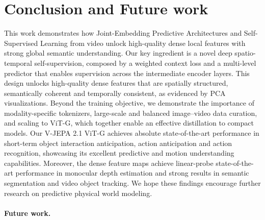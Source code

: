 \documentclass[]{fairmeta}
\begin{document}
\section{Conclusion and Future work} \label{section:conclusion}

This work demonstrates how Joint-Embedding Predictive Architectures and Self-Supervised Learning from video unlock high-quality dense local features with strong global semantic understanding.
Our key ingredient is a novel deep spatio-temporal self-supervision, composed by a weighted context loss and a multi-level predictor that enables supervision across the intermediate encoder layers.
This design unlocks high-quality dense features that are spatially structured, semantically coherent and temporally consistent, as evidenced by PCA visualizations.
Beyond the training objective, we demonstrate the importance of modality-specific tokenizers, large-scale and balanced image–video data curation, and scaling to ViT-G, which together enable an effective distillation to compact models.
Our V-JEPA 2.1 ViT-G achieves absolute state-of-the-art performance in short-term object interaction anticipation, action anticipation and action recognition, showcasing its excellent predictive and motion understanding capabilities. 
Moreover, the dense feature maps achieve linear-probe state-of-the-art performance in monocular depth estimation and strong results in semantic segmentation and video object tracking. We hope these findings encourage further research on predictive physical world modeling.



\paragraph{\bf Future work.} 
\end{document}
